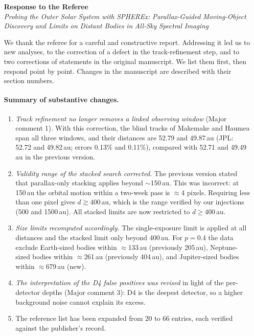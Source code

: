\documentclass[11pt]{article}
\begin{document}
\begin{center}
{\large\bfseries Response to the Referee}\\[4pt]
\emph{Probing the Outer Solar System with SPHEREx: Parallax-Guided Moving-Object Discovery and Limits on Distant Bodies in All-Sky Spectral Imaging}
\end{center}

We thank the referee for a careful and constructive report. Addressing it led us to new analyses, to the correction of a defect in the track-refinement step, and to two corrections of statements in the original manuscript. We list them first, then respond point by point. Changes in the manuscript are described with their section numbers.

\paragraph{Summary of substantive changes.}
\begin{enumerate}
\item \emph{Track refinement no longer removes a linked observing window} (Major comment 1). With this correction, the blind tracks of Makemake and Haumea span all three windows, and their distances are 52.79 and 49.87\,au (JPL: 52.72 and 49.82\,au; errors 0.13\% and 0.11\%), compared with 52.71 and 49.49\,au in the previous version.
\item \emph{Validity range of the stacked search corrected.} The previous version stated that parallax-only stacking applies beyond $\sim$150\,au. This was incorrect: at 150\,au the orbital motion within a two-week pass is $\approx$4 pixels. Requiring less than one pixel gives $d \gtrsim 400$\,au, which is the range verified by our injections (500 and 1500\,au). All stacked limits are now restricted to $d \ge 400$\,au.
\item \emph{Size limits recomputed accordingly.} The single-exposure limit is applied at all distances and the stacked limit only beyond 400\,au. For $p = 0.4$ the data exclude Earth-sized bodies within $\approx$133\,au (previously 205\,au), Neptune-sized bodies within $\approx$261\,au (previously 404\,au), and Jupiter-sized bodies within $\approx$679\,au (new).
\item \emph{The interpretation of the D4 false positives was revised} in light of the per-detector depths (Major comment 3): D4 is the deepest detector, so a higher background noise cannot explain its excess.
\item The reference list has been expanded from 20 to 66 entries, each verified against the publisher's record.
\end{enumerate}
\end{document}
